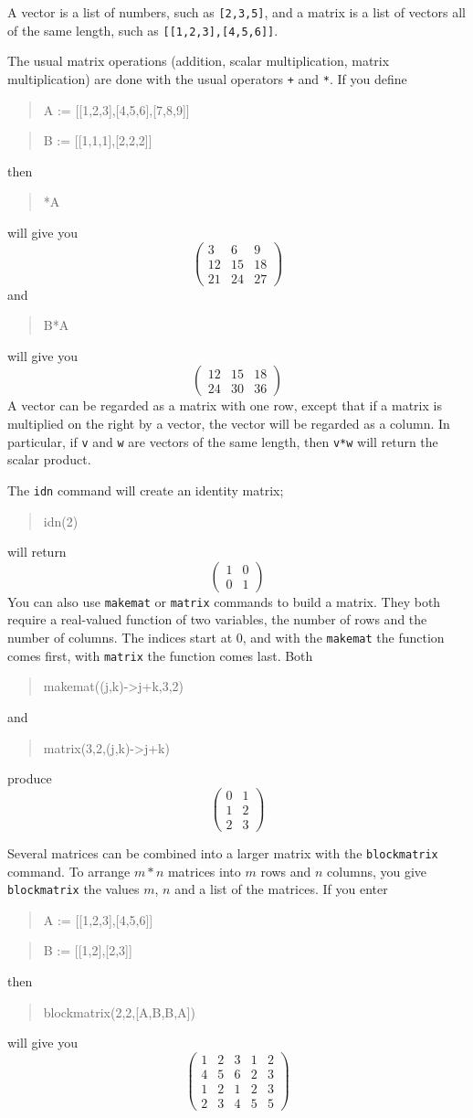 \documentclass{article}
\newcommand{\xcasin}[1]
{\begin{quote}\ttfamily
#1
\end{quote}}
\newcommand{\xcasout}[1]
{\begin{equation*}
#1
\end{equation*}}
\begin{document}
A vector is a list of numbers, such as \texttt{[2,3,5]}, and a matrix
is a list of vectors all of the same length, such as
\texttt{[[1,2,3],[4,5,6]]}.

The usual matrix operations (addition, scalar multiplication, matrix
multiplication) are done with the usual operators \texttt{+} and
\texttt{*}.  If you define
\xcasin{A := [[1,2,3],[4,5,6],[7,8,9]]}
\xcasin{B := [[1,1,1],[2,2,2]]}
then
\xcasin{3*A}
will give you
\xcasout{
\begin{pmatrix}
3 &   6 &  9\\
12 & 15 & 18\\
21 & 24 & 27
\end{pmatrix}}
and
\xcasin{B*A}
will give you
\xcasout{
\begin{pmatrix}
12 & 15 & 18\\
24 & 30 & 36
\end{pmatrix}}
A vector can be regarded as a matrix with one row, except that if a matrix
is multiplied on the right by a vector, the vector will be regarded as
a column.  In particular, if \texttt{v} and \texttt{w} are vectors of
the same length, then \texttt{v*w} will return the scalar product.

The \texttt{idn} command will create an identity matrix;
\xcasin{idn(2)}
will return
\xcasout{
\begin{pmatrix}
1 & 0\\
0 & 1
\end{pmatrix}}
You can also use \texttt{makemat} or \texttt{matrix} commands to build
a matrix. They both require a real-valued function of two variables,
the number of rows and the number of columns.  The indices start at 0,
and with the \texttt{makemat} the function comes first, with
\texttt{matrix} the function comes last.  Both
\xcasin{makemat((j,k)->j+k,3,2)}
and
\xcasin{matrix(3,2,(j,k)->j+k)}
produce
\xcasout{
\begin{pmatrix}
0 & 1\\
1 & 2\\
2 & 3
\end{pmatrix}}

Several matrices can be combined into a larger matrix with the
\texttt{blockmatrix} command.  To arrange $m * n$ matrices
into $m$ rows and $n$ columns, you give \texttt{blockmatrix} the
values $m$, $n$ and a list of the matrices.  If you enter
\xcasin{A := [[1,2,3],[4,5,6]]}
\xcasin{B := [[1,2],[2,3]]}
then
\xcasin{blockmatrix(2,2,[A,B,B,A])}
will give you
\xcasout{
\begin{pmatrix}
1 & 2 & 3 & 1 & 2\\
4 & 5 & 6 & 2 & 3\\
1 & 2 & 1 & 2 & 3\\
2 & 3 & 4 & 5 & 5
\end{pmatrix}}
\end{document}
